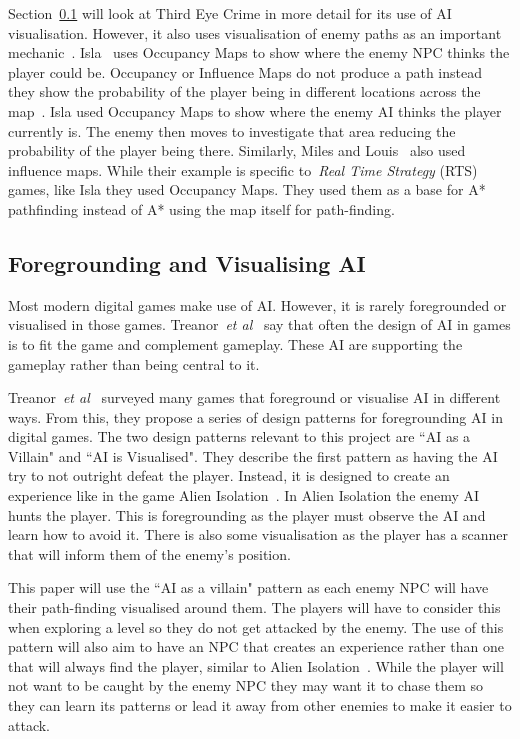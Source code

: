 \documentclass[journal]{IEEEtran}
\begin{document}
	Section~\ref{VisualisingAI} will look at Third Eye Crime in more detail for its use of AI visualisation. However, it also uses visualisation of enemy paths as an important mechanic~\cite{Isla2014, game:ThirdEyeCrime}.  Isla~\cite{Isla2014} uses Occupancy Maps to show where the enemy NPC thinks the player could be. Occupancy or Influence Maps do not produce a path instead they show the probability of the player being in different locations across the map~\cite{Isla2014, Miles2006}. Isla used Occupancy Maps to show where the enemy AI thinks the player currently is. The enemy then moves to investigate that area reducing the probability of the player being there.  Similarly, Miles and Louis~\cite{Miles2006} also used influence maps. While their example is specific to~\textit{Real Time Strategy} (RTS) games, like Isla they used Occupancy Maps.  They used them as a base for A* pathfinding instead of A* using the map itself for path-finding.
	
	
	\subsection{Foregrounding and Visualising AI} \label{VisualisingAI}
	Most modern digital games make use of AI.  However, it is rarely foregrounded or visualised in those games. Treanor~\textit{et al}~\cite{treanor2015} say that often the design of AI in games is to fit the game and complement gameplay. These AI are supporting the gameplay rather than being central to it.
	
	Treanor~\textit{et al}~\cite{treanor2015} surveyed many games that foreground or visualise AI in different ways.   From this, they propose a series of design patterns for foregrounding AI in digital games. 
	The two design patterns relevant to this project are ``AI as a Villain" and ``AI is Visualised".  They describe the first pattern as having the AI try to not outright defeat the player. Instead, it is designed to create an experience like in the game Alien Isolation~\cite{treanor2015, game:AlienIsolation}.  In Alien Isolation the enemy AI hunts the player. This is foregrounding as the player must observe the AI and learn how to avoid it. There is also some visualisation as the player has a scanner that will inform them of the enemy's position. 
	
	This paper will use the ``AI as a villain" pattern as each enemy NPC will have their path-finding visualised around them. The players will have to consider this when exploring a level so they do not get attacked by the enemy. The use of this pattern will also aim to have an NPC that creates an experience rather than one that will always find the player, similar to Alien Isolation~\cite{game:AlienIsolation,treanor2015}. While the player will not want to be caught by the enemy NPC they may want it to chase them so they can learn its patterns or lead it away from other enemies to make it easier to attack. 
	
\end{document}
